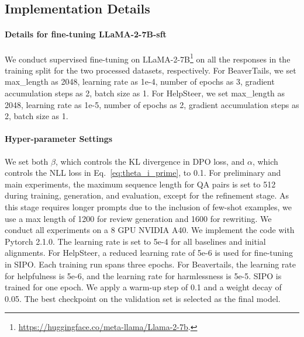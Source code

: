 \subsection{Implementation Details}
\label{appd A3}

\paragraph{Details for fine-tuning LLaMA-2-7B-sft}
We conduct supervised fine-tuning on LLaMA-2-7B\footnote{\url{https://huggingface.co/meta-llama/Llama-2-7b}. } on all the responses in the training split for the two processed datasets, respectively.
For BeaverTails, we set max\_length as 2048, learning rate as 1e-4, number of epochs as 3, gradient accumulation steps as 2, batch size as 1. 
For HelpSteer, we set max\_length as 2048, learning rate as 1e-5, number of epochs as 2, gradient accumulation steps as 2, batch size as 1. 

\paragraph{Hyper-parameter Settings}
We set both $\beta$, which controls the KL divergence in DPO loss, and $\alpha$, which controls the NLL loss in Eq.~\eqref{eq:theta_i_prime}, to 0.1. 
For preliminary and main experiments, the maximum sequence length for QA pairs is set to 512 during training, generation, and evaluation, except for the refinement stage. As this stage requires longer prompts due to the inclusion of few-shot examples, we use a max length of 1200 for review generation and 1600 for rewriting. 
We conduct all experiments on a 8 GPU NVIDIA A40. 
We implement the code with Pytorch 2.1.0. 
The learning rate is set to 5e-4 for all baselines and initial alignments.
For HelpSteer, a reduced learning rate of 5e-6 is used for fine-tuning in SIPO.  
Each training run spans three epochs.
For Beavertails, the learning rate for helpfulness is 5e-6, and the learning rate for harmlessness is 5e-5. SIPO is trained for one epoch. 
We apply a warm-up step of 0.1 and a weight decay of 0.05.
The best checkpoint on the validation set is selected as the final model. 

